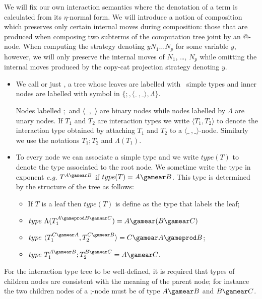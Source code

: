 We will fix our own interaction semantics where the denotation of a term is calculated from its $\eta$-normal
form. We will introduce a notion of composition which preserves only certain internal moves
during composition: those that are produced when
composing two subterms of the computation tree joint by an @-node.
When computing the strategy denoting $y N_1 \ldots
N_p$ for some variable $y$, however, we will only preserve the internal moves of
$N_1$, \ldots, $N_p$ while omitting the internal moves produced by
the copy-cat projection strategy denoting $y$.


\begin{definition} \hfill
\begin{itemize}
\item We call  or just ,
a tree whose leaves are labelled with \pcf\ simple types and
inner nodes are labelled with symbol in $\{ ;, \langle \_\ ,\_
\rangle, \Lambda \}$.


Nodes labelled $;$ and $\langle \_\ ,\_ \rangle$ are binary
nodes while nodes labelled by $\Lambda$ are unary nodes. If
$T_1$ and $T_2$ are interaction types we write $\langle T_1, T_2
\rangle$ to denote the interaction type obtained by attaching
$T_1$ and $T_2$ to a $\langle \_\ ,\_ \rangle$-node. Similarly
we use the notations $T_1 ; T_2$ and $\Lambda(T_1)$.

\item To every node we can associate a simple type and we write
    $type(T)$ to denote the type associated to the root node. We
    sometime write the type in exponent {\it e.g.} $T^{A\gamear
    B}$ if $type(T) = A\gamear B$. This type is determined by
    the structure of the tree as follows:
    \begin{itemize}
    \item If $T$ is a leaf then $type(T)$ is define as the type that labels the leaf;

    \item $type\ \Lambda(T_1^{A \gameprod B \gamear C}) = A \gamear (B \gamear C)$

    \item $type\ \langle T_1^{C \gamear A} , T_2^{C \gamear B} \rangle =
    C \gamear A \gameprod B$;

    \item $type\ T_1^{A \gamear B};T_2^{B \gamear C} = A \gamear C$.
    \end{itemize}

\end{itemize}

For the interaction type tree to be well-defined, it is required
that types of children nodes are consistent with the meaning of the
parent node; for instance the two children nodes of a ;-node must be
of type $A\gamear B$ and $B\gamear C$.

\end{definition}


